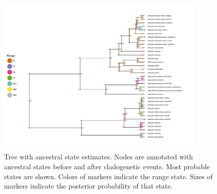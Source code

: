 \begin{figure}[!ht]
\centering
\includegraphics[width=0.9\textwidth]{figures/fig_epoch_RevGadgets_ase.pdf}
\caption{Tree with ancestral state estimates. Nodes are annotated with ancestral states before and after cladogenetic events. Most probable states are shown. Colors of markers indicate the range state. Sizes of markers indicate the posterior probability of that state. }
\label{fig:epoch_RevGadgets_ase}
\end{figure}


\newpage
